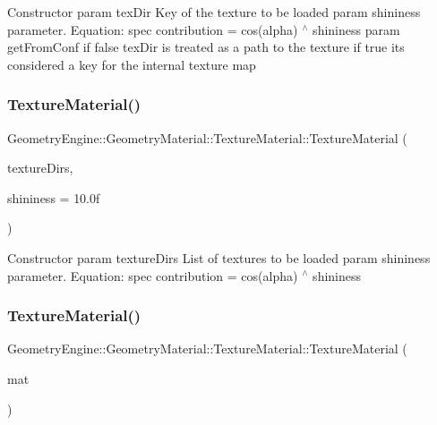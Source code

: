 Constructor param tex\+Dir Key of the texture to be loaded param shininess parameter. Equation\+: spec contribution = cos(alpha) $^\wedge$ shininess param get\+From\+Conf if false tex\+Dir is treated as a path to the texture if true its considered a key for the internal texture map \mbox{\label{class_geometry_engine_1_1_geometry_material_1_1_texture_material_af6c96a0f976b0ed3d558d7d395ec35b2}} 
\subsubsection{\texorpdfstring{TextureMaterial()}{TextureMaterial()}\hspace{0.1cm}{\footnotesize\ttfamily [2/4]}}
{\footnotesize\ttfamily Geometry\+Engine\+::\+Geometry\+Material\+::\+Texture\+Material\+::\+Texture\+Material (\begin{DoxyParamCaption}\item[{const std\+::list$<$ \mbox{\hyperlink{class_geometry_engine_1_1_geometry_material_1_1_texture_parameters}{Texture\+Parameters}} $\ast$ $>$ \&}]{texture\+Dirs,  }\item[{float}]{shininess = {\ttfamily 10.0f} }\end{DoxyParamCaption})}

Constructor param texture\+Dirs List of textures to be loaded param shininess parameter. Equation\+: spec contribution = cos(alpha) $^\wedge$ shininess \mbox{\label{class_geometry_engine_1_1_geometry_material_1_1_texture_material_a60678cd8338eeae2996e72b1d96a2364}} 
\subsubsection{\texorpdfstring{TextureMaterial()}{TextureMaterial()}\hspace{0.1cm}{\footnotesize\ttfamily [3/4]}}
{\footnotesize\ttfamily Geometry\+Engine\+::\+Geometry\+Material\+::\+Texture\+Material\+::\+Texture\+Material (\begin{DoxyParamCaption}\item[{const \mbox{\hyperlink{class_geometry_engine_1_1_geometry_material_1_1_texture_material}{Texture\+Material}} \&}]{mat }\end{DoxyParamCaption})}

